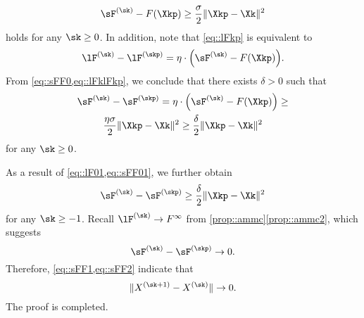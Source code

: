 \begin{equation}\label{eq::sFF0}
	\sF^{(\sk)}-F(\Xkp) \geq  \frac{\sigma}{2}\|\Xkp-\Xk\|^2
\end{equation}
holds for any $\sk\geq 0$. In addition, note that \cref{eq::lFkp} is equivalent to
\begin{equation}\label{eq::lFklFkp}
	\lF^{(\sk)}-\lF^{(\skp)}= \eta\cdot\Big(\sF^{(\sk)}-F(\Xkp)\Big).
\end{equation} 
From \cref{eq::sFF0,eq::lFklFkp}, we conclude that there exists $\delta > 0$ such that
\begin{multline}\label{eq::sFF01}
\sF^{(\sk)}-\sF^{(\skp)}=\eta\cdot\Big(\sF^{(\sk)}-F(\Xkp)\Big) \geq \\
\frac{\eta\sigma}{2}\|\Xkp-\Xk\|^2 \geq \frac{\delta}{2}\|\Xkp-\Xk\|^2
\end{multline}
for any $\sk\geq 0$. 

As a result of \cref{eq::lF01,eq::sFF01}, we further obtain
\begin{equation}\label{eq::sFF1}
\sF^{(\sk)}-\sF^{(\skp)}\geq \frac{\delta}{2}\|\Xkp-\Xk\|^2
\end{equation}
for any $\sk\geq -1$. Recall $\lF^{(\sk)}\rightarrow F^\infty$ from \cref{prop::ammc}\ref{prop::ammc2}, which suggests
\begin{equation}\label{eq::sFF2}
	\sF^{(\sk)} - \sF^{(\skp)}\rightarrow 0.
\end{equation}
Therefore, \cref{eq::sFF1,eq::sFF2} indicate that
\begin{equation}
	\nonumber
	\|X^{(\sk+1)}-X^{(\sk)}\| \rightarrow 0.
\end{equation}
The proof is completed.


